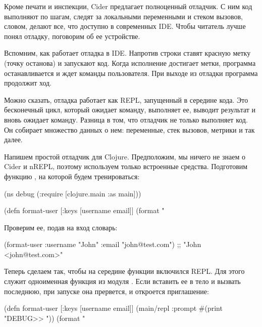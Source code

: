 Кроме печати и инспекции, Cider предлагает полноценный отладчик. С ним код выполняют по шагам, следят за локальными переменными и стеком вызовов, словом, делают все, что доступно в современных IDE. Чтобы читатель лучше понял отладку, поговорим об ее устройстве.

Вспомним, как работает отладка в IDE. Напротив строки ставят красную метку (точку останова) и запускают код. Когда исполнение достигает метки, программа останавливается и ждет команды пользователя. При выходе из отладки программа продолжит ход.

Можно сказать, отладка работает как REPL, запущенный в середине кода. Это бесконечный цикл, который ожидает команду, выполняет ее, выводит результат и вновь ожидает команду. Разница в том, что отладчик не только выполняет код. Он собирает множество данных о нем: переменные, стек вызовов, метрики и так далее.

Напишем простой отладчик для Clojure. Предположим, мы ничего не знаем о Cider и nREPL, поэтому используем только встроенные средства. Подготовим функцию , на которой будем тренироваться:

\begin{english}
  \begin{clojure}
(ns debug
  (:require [clojure.main :as main]))

(defn format-user
  [{:keys [username email]}]
  (format "%
  \end{clojure}
\end{english}

Проверим ее, подав на вход словарь:

\begin{english}
  \begin{clojure}
(format-user {:username "John"
              :email "john@test.com"})
;; "John <john@test.com>"
  \end{clojure}
\end{english}

Теперь сделаем так, чтобы на середине функции включился REPL. Для этого служит одноименная функция из модуля . Если вставить ее в тело  и вызвать последнюю, при запуске она прервется, и откроется приглашение:

\begin{english}
  \begin{clojure/lines}
(defn format-user
  [{:keys [username email]}]
  (main/repl :prompt #(print "DEBUG>> "))
  (format "%
  \end{clojure/lines}
\end{english}

